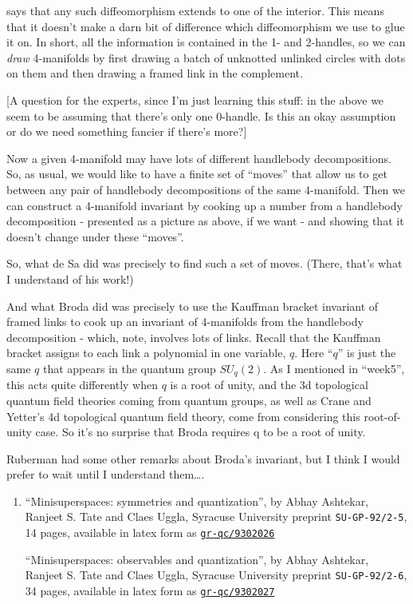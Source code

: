 \documentclass{article}
\begin{document}
says that any such diffeomorphism extends to one of the interior. This
means that it doesn't make a darn bit of difference which diffeomorphism
we use to glue it on. In short, all the information is contained in the
1- and 2-handles, so we can \emph{draw} 4-manifolds by first drawing a
batch of unknotted unlinked circles with dots on them and then drawing a
framed link in the complement.

{[}A question for the experts, since I'm just learning this stuff: in
the above we seem to be assuming that there's only one 0-handle. Is this
an okay assumption or do we need something fancier if there's more?{]}

Now a given 4-manifold may have lots of different handlebody
decompositions. So, as usual, we would like to have a finite set of
``moves'' that allow us to get between any pair of handlebody
decompositions of the same 4-manifold. Then we can construct a
4-manifold invariant by cooking up a number from a handlebody
decomposition - presented as a picture as above, if we want - and
showing that it doesn't change under these ``moves''.

So, what de Sa did was precisely to find such a set of moves. (There,
that's what I understand of his work!)

And what Broda did was precisely to use the Kauffman bracket invariant
of framed links to cook up an invariant of 4-manifolds from the
handlebody decomposition - which, note, involves lots of links. Recall
that the Kauffman bracket assigns to each link a polynomial in one
variable, \(q\). Here ``\(q\)'' is just the same \(q\) that appears in
the quantum group \(SU_q(2)\). As I mentioned in ``week5'', this acts
quite differently when \(q\) is a root of unity, and the 3d topological
quantum field theories coming from quantum groups, as well as Crane and
Yetter's 4d topological quantum field theory, come from considering this
root-of-unity case. So it's no surprise that Broda requires q to be a
root of unity.

Ruberman had some other remarks about Broda's invariant, but I think I
would prefer to wait until I understand them\ldots.

\begin{enumerate}
\def\labelenumi{\arabic{enumi})}
\setcounter{enumi}{1}
\item
  ``Minisuperspaces: symmetries and quantization'', by Abhay Ashtekar,
  Ranjeet S. Tate and Claes Uggla, Syracuse University preprint
  \texttt{SU-GP-92/2-5}, 14 pages, available in latex form as
  \href{http://xxx.lanl.gov/abs/gr-qc/9302026}{\texttt{gr-qc/9302026}}

  ``Minisuperspaces: observables and quantization'', by Abhay Ashtekar,
  Ranjeet S. Tate and Claes Uggla, Syracuse University preprint
  \texttt{SU-GP-92/2-6}, 34 pages, available in latex form as
  \href{http://xxx.lanl.gov/abs/gr-qc/9302027}{\texttt{gr-qc/9302027}}
\end{enumerate}
\end{document}
